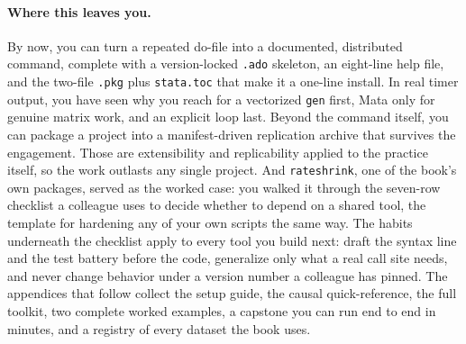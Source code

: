 \documentclass[
    a4paper,
    fontsize=10pt,
    twoside=true,
    numbers=noenddot,
]{kaobook}
\begin{document}
\paragraph{Where this leaves you.} By now, you can turn a repeated do-file into a documented, distributed command, complete with a version-locked \texttt{.ado} skeleton, an eight-line help file, and the two-file \texttt{.pkg} plus \texttt{stata.toc} that make it a one-line install. In real timer output, you have seen why you reach for a vectorized \texttt{gen} first, Mata only for genuine matrix work, and an explicit loop last. Beyond the command itself, you can package a project into a manifest-driven replication archive that survives the engagement. Those are extensibility and replicability applied to the practice itself, so the work outlasts any single project. And \texttt{rateshrink}, one of the book's own packages, served as the worked case: you walked it through the seven-row checklist a colleague uses to decide whether to depend on a shared tool, the template for hardening any of your own scripts the same way. The habits underneath the checklist apply to every tool you build next: draft the syntax line and the test battery before the code, generalize only what a real call site needs, and never change behavior under a version number a colleague has pinned. The appendices that follow collect the setup guide, the causal quick-reference, the full toolkit, two complete worked examples, a capstone you can run end to end in minutes, and a registry of every dataset the book uses.
\end{document}
